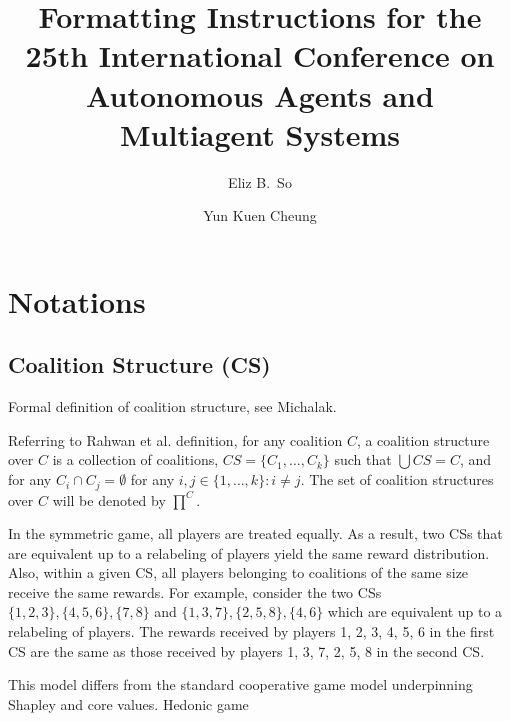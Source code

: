 \documentclass[sigconf,anonymous]{aamas}
\title[AAMAS-2026 Formatting Instructions]{Formatting Instructions for the 25th International Conference on Autonomous Agents and Multiagent Systems}
\author{Eliz B.~So}
\affiliation{
  \institution{Australian National University}
  \city{Canberra}
  \country{Australia }}
\author{Yun Kuen Cheung}
\affiliation{
  \institution{Australian National University}
  \city{Canberra}
  \country{Australia}}
\newcommand{\ykc}[1]{{\color{blue} #1}}
\begin{document}

\pagestyle{fancy}
\fancyhead{}


\maketitle 



\section{Notations}


\subsection{Coalition Structure (CS)}

\ykc{Formal definition of coalition structure, see Michalak.}

Referring to Rahwan et al. definition, for any coalition $C$, a coalition structure over $C$ is a collection of coalitions, $CS = \{ C_1, \dots, C_k\}$ such that $\bigcup CS = C$, and for any $C_i \cap C_j = \emptyset$ for any $i, j \in \{1, \dots, k\}:i\neq j$. The set of coalition structures over $C$ will be denoted by $\prod^C$.

In the symmetric game, all players are treated equally. As a result, two CSs that are equivalent up to a relabeling of players yield the same reward distribution. Also, within a given CS, all players belonging to coalitions of the same size receive the same rewards. For example, consider the two CSs $\{1, 2, 3\}, \{4, 5, 6\}, \{7, 8\}$ and $\{1, 3, 7\}, \{2, 5, 8\}, \{4, 6\}$ which are equivalent up to a relabeling of players. The rewards received by players 1, 2, 3, 4, 5, 6 in the first CS are the same as those received by players
1, 3, 7, 2, 5, 8 in the second CS.

This model differs from the standard cooperative game model underpinning Shapley and core values. %
\ykc{Hedonic game}
\end{document}
